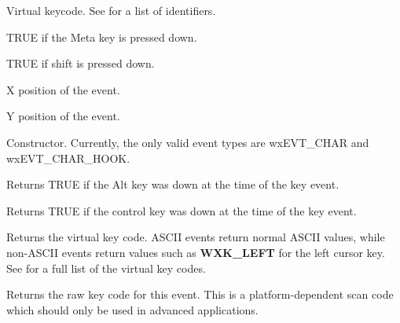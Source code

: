 

Virtual keycode. See  for a list of identifiers.



TRUE if the Meta key is pressed down.



TRUE if shift is pressed down.



X position of the event.



Y position of the event.



Constructor. Currently, the only valid event types are wxEVT\_CHAR and wxEVT\_CHAR\_HOOK.



Returns TRUE if the Alt key was down at the time of the key event.



Returns TRUE if the control key was down at the time of the key event.



Returns the virtual key code. ASCII events return normal ASCII values,
while non-ASCII events return values such as {\bf WXK\_LEFT} for the
left cursor key. See  for a full list of the virtual key codes.



Returns the raw key code for this event. This is a platform-dependent scan code
which should only be used in advanced applications.

